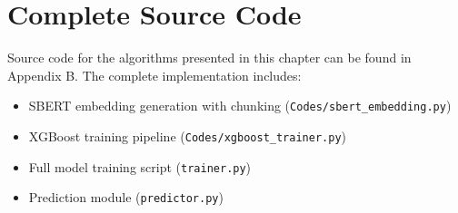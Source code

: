 \section{Complete Source Code}

Source code for the algorithms presented in this chapter can be found in Appendix B. The complete implementation includes:

\begin{itemize}
    \item SBERT embedding generation with chunking (\texttt{Codes/sbert\_embedding.py})
    \item XGBoost training pipeline (\texttt{Codes/xgboost\_trainer.py})
    \item Full model training script (\texttt{trainer.py})
    \item Prediction module (\texttt{predictor.py})
\end{itemize}

\endinput
